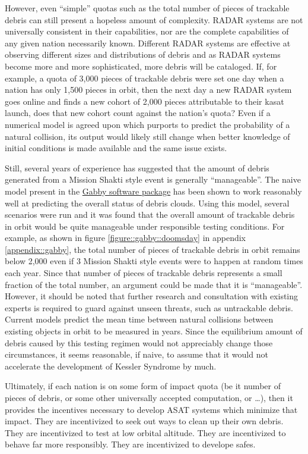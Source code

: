 However, even ``simple'' quotas such as the total number of pieces of
trackable debris can still present a hopeless amount of complexity.
RADAR systems are not universally consistent in their
capabilities\cite[T4]{cpl-oreilly}, nor are the complete capabilities
of any given nation necessarily known. Different RADAR systems are
effective at observing different sizes and distributions of debris and
as RADAR systems become more and more sophisticated, more debris will
be cataloged.  If, for example, a quota of 3,000 pieces of trackable
debris were set one day when a nation has only 1,500 pieces in orbit,
then the next day a new RADAR system goes online and finds a new
cohort of 2,000 pieces attributable to their \ac{kasat} launch, does
that new cohort count against the nation's quota?  Even if a numerical
model is agreed upon which purports to predict the probability of a
natural collision, its output would likely still change when better
knowledge of initial conditions is made available and the same issue
exists.

Still, several years of experience has suggested that the amount of
debris generated from a Mission Shakti style event is generally
``manageable''.  The naive model present in the
\href{https://github.com/harrison-caudill/gabby}{Gabby software
  package} has been shown to work reasonably well at predicting the
overall status of debris clouds.\cite{gabby} Using this model, several
scenarios were run and it was found that the overall amount of
trackable debris in orbit would be quite manageable under responsible
testing conditions.  For example, as shown in figure
\ref{figure::gabby::doomsday} in appendix \ref{appendix::gabby}, the
total number of pieces of trackable debris in orbit remains below
2,000 even if 3 Mission Shakti style events were to happen at random
times each year.  Since that number of pieces of trackable debris
represents a small fraction of the total number, an argument could be
made that it is ``manageable''.  However, it should be noted that
further research and consultation with existing experts is required to
guard against unseen threats, such as untrackable debris.  Current
models predict the mean time between natural collisions between
existing objects in orbit to be measured in
years.\cite[p6]{kessler-reunion} Since the equilibrium amount of
debris caused by this testing regimen would not appreciably change
those circumstances, it seems reasonable, if naive, to assume that it
would not accelerate the development of Kessler Syndrome by much.

Ultimately, if each nation is on some form of impact quota (be it
number of pieces of debris, or some other universally accepted
computation, or \ldots), then it provides the incentives necessary to
develop ASAT systems which minimize that impact.  They are
incentivized to seek out ways to clean up their own debris.  They are
incentivized to test at low orbital altitude.  They are incentivized
to behave far more responsibly.  They are incentivized to develope
\acp{safe}.

